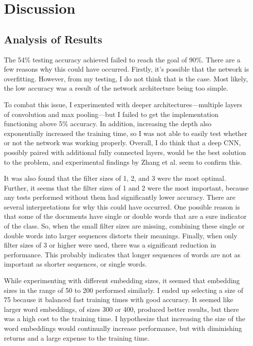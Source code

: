 \documentclass{article}
\begin{document}
\section{Discussion}
\subsection{Analysis of Results}
The 54\% testing accuracy achieved failed to reach the goal of 90\%. There are a few reasons why this could have occurred.
Firstly, it's possible that the network is overfitting. However, from my testing, I do not think that is the case. Most likely, the low
accuracy was a result of the network architecture being too simple.

To combat this issue, I experimented with deeper architectures—multiple layers of convolution and max pooling—but I failed to get the
implementation functioning above 5\% accuracy. In addition, increasing the depth also exponentially increased the training time, so I was not
able to easily test whether or not the network was working properly. Overall, I do think that a deep CNN, possibly paired with additional
fully connected layers, would be the best solution to the problem, and experimental findings by Zhang et al. \cite{zhang} seem to confirm this.

It was also found that the filter sizes of 1, 2, and 3 were the most optimal. Further, it seems that the filter sizes of 1 and 2 were the most
important, because any tests performed without them had significantly lower accuracy. There are several interpretations for why this could
have occurred. One possible reason is that some of the documents have single or double words that are a sure indicator of the class. So, when the
small filter sizes are missing, combining these single or double words into larger sequences distorts their meanings. Finally, when only filter sizes
of 3 or higher were used, there was a significant reduction in performance. This probably indicates that longer sequences of words are not as
important as shorter sequences, or single words.

While experimenting with different embedding sizes, it seemed that embedding sizes in the range of 50 to 200 performed similarly. I ended up
selecting a size of 75 because it balanced fast training times with good accuracy. It seemed like
larger word embeddings, of sizes 300 or 400, produced better results, but there was a high cost to the training time. I hypothesize that
increasing the size of the word embeddings would continually increase performance, but with diminishing returns and a large expense to the
training time.
\end{document}
